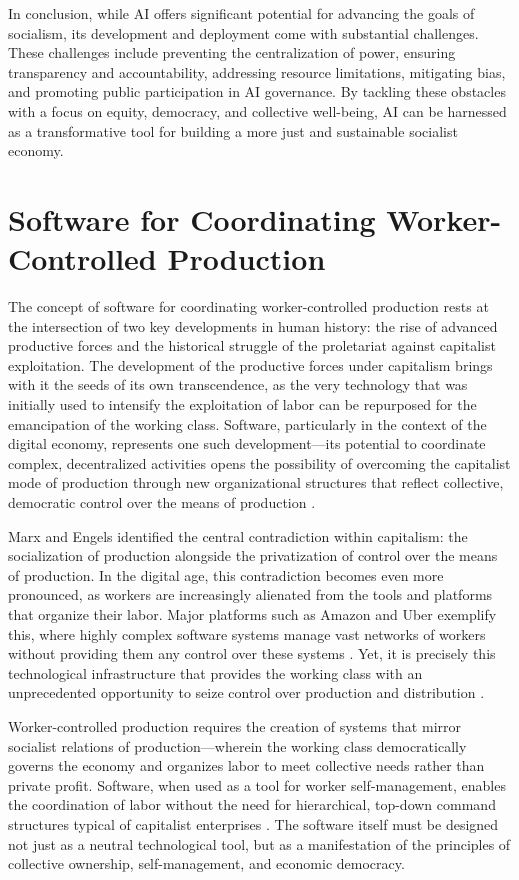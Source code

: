 \begin{refsection}
In conclusion, while AI offers significant potential for advancing the goals of socialism, its development and deployment come with substantial challenges. These challenges include preventing the centralization of power, ensuring transparency and accountability, addressing resource limitations, mitigating bias, and promoting public participation in AI governance. By tackling these obstacles with a focus on equity, democracy, and collective well-being, AI can be harnessed as a transformative tool for building a more just and sustainable socialist economy.

\section{Software for Coordinating Worker-Controlled Production}

The concept of software for coordinating worker-controlled production rests at the intersection of two key developments in human history: the rise of advanced productive forces and the historical struggle of the proletariat against capitalist exploitation. The development of the productive forces under capitalism brings with it the seeds of its own transcendence, as the very technology that was initially used to intensify the exploitation of labor can be repurposed for the emancipation of the working class. Software, particularly in the context of the digital economy, represents one such development—its potential to coordinate complex, decentralized activities opens the possibility of overcoming the capitalist mode of production through new organizational structures that reflect collective, democratic control over the means of production \cite[pp.~13-17]{marx1959}.

Marx and Engels identified the central contradiction within capitalism: the socialization of production alongside the privatization of control over the means of production. In the digital age, this contradiction becomes even more pronounced, as workers are increasingly alienated from the tools and platforms that organize their labor. Major platforms such as Amazon and Uber exemplify this, where highly complex software systems manage vast networks of workers without providing them any control over these systems \cite[pp.~20-25]{braverman1974}. Yet, it is precisely this technological infrastructure that provides the working class with an unprecedented opportunity to seize control over production and distribution \cite[pp.~41-44]{lenin2017}.

Worker-controlled production requires the creation of systems that mirror socialist relations of production—wherein the working class democratically governs the economy and organizes labor to meet collective needs rather than private profit. Software, when used as a tool for worker self-management, enables the coordination of labor without the need for hierarchical, top-down command structures typical of capitalist enterprises \cite[pp.~88-92]{negre2003}. The software itself must be designed not just as a neutral technological tool, but as a manifestation of the principles of collective ownership, self-management, and economic democracy.


\end{refsection}
